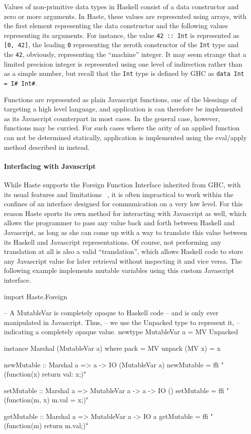 \documentclass[preprint]{sigplanconf}
\begin{document}
Values of non-primitive data types in Haskell consist of a data constructor and
zero or more arguments. In Haste, these values are represented using arrays,
with the first element representing the data constructor and the following
values representing its arguments. For instance, the value \lstinline!42 :: Int!
is represented as \lstinline![0, 42]!, the leading \lstinline!0! representing
the zeroth constructor of the \lstinline!Int! type and the \lstinline!42!,
obviously, representing the ``machine'' integer. It may seem strange that a
limited precision integer is represented using one level of indirection rather
than as a simple number, but recall that the \lstinline!Int! type is defined by
GHC as \lstinline!data Int = I# Int#!.

Functions are represented as plain Javascript functions, one of the blessings
of targeting a high level language, and application is can therefore be
implemented as its Javascript counterpart in most cases. In the general case,
however, functions may be curried. For such cases where the arity of an applied
function can not be determined statically, application is implemented using the
eval/apply method described in \cite{fastcurry} instead.

\paragraph{Interfacing with Javascript} While Haste supports the Foreign
Function Interface inherited from GHC, with its usual features and limitations
\ \cite{ffi}, it is often impractical to work within the confines of an
interface designed for communication on a very low level. For this reason
Haste sports its own method for interacting with Javascript as well, which
allows the programmer to pass any value back and forth between Haskell and
Javascript, as long as she can come up with a way to translate this value
between its Haskell and Javascript representations. Of course, not performing
any translation at all is also a valid ``translation'', which allows Haskell
code to store any Javascript value for later retrieval without inspecting it
and vice versa. The following example implements mutable variables using this
custom Javascript interface.

\begin{code}
import Haste.Foreign

-- A MutableVar is completely opaque to Haskell code
-- and is only ever manipulated in Javascript. Thus,
-- we use the Unpacked type to represent it,
-- indicating a completely opaque value.
newtype MutableVar a = MV Unpacked

instance Marshal (MutableVar a) where
  pack          = MV
  unpack (MV x) = x

newMutable :: Marshal a => a -> IO (MutableVar a)
newMutable = ffi "(function(x) {return {val: x};})"

setMutable :: Marshal a => MutableVar a -> a -> IO ()
setMutable = ffi "(function(m, x) {m.val = x;})"

getMutable :: Marshal a => MutableVar a -> IO a
getMutable = ffi "(function(m) {return m.val;})"
\end{code}
\end{document}
